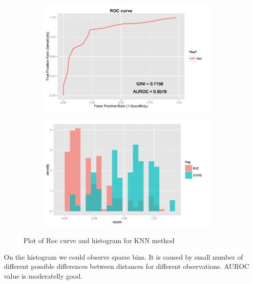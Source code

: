 \documentclass[10pt]{article}\usepackage[]{graphicx}\usepackage[]{color}
\begin{document}
\begin{figure}[h!]
        \centering
        \begin{subfigure}[b]{0.45\textwidth}
                \includegraphics[width=\textwidth]{Plots/ROC_KNN}
                \caption{}
                \label{fig:ROC_ KNN}
        \end{subfigure}
        \begin{subfigure}[b]{0.45\textwidth}
                \includegraphics[width=\textwidth]{Plots/HIST_KNN}
                \label{fig:HIST_ KNN}
        \end{subfigure}

        \caption{Plot of Roc curve and histogram for KNN method}\label{fig:KNN}
\end{figure}

On the histogram we could observe sparse bins. It is caused by small number of different possible differences between distances for different observations. AUROC value is moderatelly good. 
\end{document}
